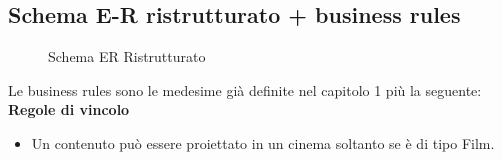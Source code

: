 \documentclass[a4paper]{article}
\begin{document}
\subsection{Schema E-R ristrutturato + business rules}
\begin{center}
\begin{figure}[h]
  \caption{Schema ER Ristrutturato}
  \end{figure}
\end{center}

Le business rules sono le medesime già definite nel capitolo 1 più la seguente:\\
{\large \textbf{Regole di vincolo}}
\begin{itemize}
\item Un contenuto può essere proiettato in un cinema soltanto se è di tipo Film.\\
\end{itemize}
\end{document}

